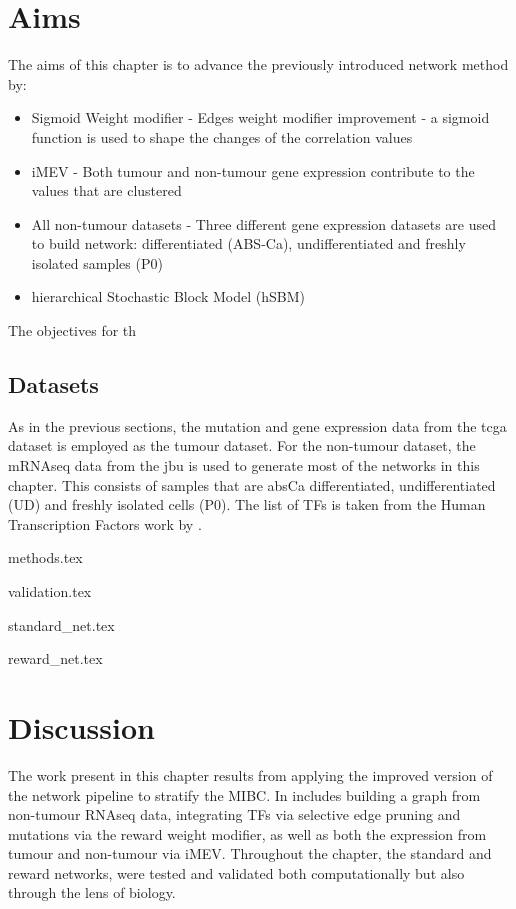 \section{Aims}

The aims of this chapter is to advance the previously introduced network method by:
\begin{itemize}
    \item Sigmoid Weight modifier - Edges weight modifier improvement - a sigmoid function is used to shape the changes of the correlation values
    \item iMEV - Both tumour and non-tumour gene expression contribute to the values that are clustered 
    \item All non-tumour datasets - Three different gene expression datasets are used to build network: differentiated (ABS-Ca), undifferentiated and freshly isolated samples (P0)
    \item hierarchical Stochastic Block Model (hSBM)
\end{itemize}

The objectives for th


\subsection*{Datasets}

As in the previous sections, the mutation and gene expression data from the \acrshort{tcga} dataset is employed as the tumour dataset. For the non-tumour dataset, the mRNAseq data from the \acrfull{jbu} is used to generate most of the networks in this chapter. This consists of samples that are \acrlong{absCa} differentiated, undifferentiated (UD) and freshly isolated cells (P0). The list of TFs is taken from the Human Transcription Factors work by \citet{Lambert2018-el}.



{methods.tex}

{validation.tex}

{standard_net.tex}

{reward_net.tex}

\section{Discussion}

The work present in this chapter results from applying the improved version of the network pipeline to stratify the MIBC. In includes building a graph from non-tumour RNAseq data, integrating TFs via selective edge pruning and mutations via the reward weight modifier, as well as both the expression from tumour and non-tumour via iMEV. Throughout the chapter, the standard and reward networks, were tested and validated both computationally but also through the lens of biology. 

